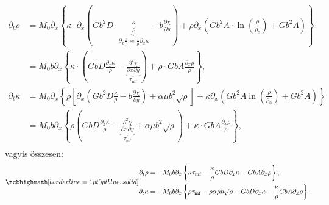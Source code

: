 \documentclass[10pt,a4paper]{scrartcl}
\begin{document}
\[\begin{aligned}
  {\partial _t}\rho  &  = {M_0}{\partial _x}\left\{ {\kappa  \cdot {\partial _x}\left( {G{b^2}D \cdot \underbrace {\frac{\kappa }{\rho }}_{{\partial _x}\frac{\kappa }{\rho } \approx \frac{1}{\rho }{\partial _x}\kappa } - b\frac{{\partial \chi }}{{\partial y}}} \right) + \rho {\partial _x}\left( {G{b^2}A \cdot \ln \left( {\frac{\rho }{{{\rho _0}}}} \right) + G{b^2}A} \right)} \right\} \\ 
   &  = {M_0}b{\partial _x}\left\{ {\kappa  \cdot \left( {GbD\frac{{{\partial _x}\kappa }}{\rho } - \underbrace {\frac{{{\partial ^2}\chi }}{{\partial x\partial y}}}_{{\tau _{{\text{mf}}}}}} \right) + \rho  \cdot GbA\frac{{{\partial _x}\rho }}{\rho }} \right\}, \\ 
  {\partial _t}\kappa  &  = {M_0}{\partial _x}\left\{ {\rho \left[ {{\partial _x}\left( {G{b^2}D\frac{\kappa }{\rho } - b\frac{{\partial \chi }}{{\partial y}}} \right) + \alpha \mu {b^2}\sqrt \rho } \right] + \kappa {\partial _x}\left( {G{b^2}A\ln \left( {\frac{\rho }{{{\rho _0}}}} \right) + G{b^2}A} \right)} \right\} \\ 
   &  = {M_0}b{\partial _x}\left\{ {\rho \left( {GbD\frac{{{\partial _x}\kappa }}{\rho } - \underbrace {\frac{{{\partial ^2}\chi }}{{\partial x\partial y}}}_{{\tau _{{\text{mf}}}}} + \alpha \mu {b^2}\sqrt \rho } \right) + \kappa  \cdot GbA\frac{{{\partial _x}\rho }}{\rho }} \right\}, \\ 
\end{aligned} \]
vagyis összesen:
\begin{gather} \label{eq:rho_kappa}
\tcbhighmath[borderline={1pt}{0pt}{blue,solid}]{
\begin{aligned}
  {\partial _t}\rho  &  =  - {M_0}b{\partial _x}\left\{ {\kappa {\tau _{{\text{mf}}}} - \frac{\kappa }{\rho }GbD{\partial _x}\kappa  - GbA{\partial _x}\rho } \right\}, \\ 
  {\partial _t}\kappa  &  =  - {M_0}b{\partial _x}\left\{ {\rho {\tau _{{\text{mf}}}} - \rho \alpha \mu b\sqrt \rho - GbD{\partial _x}\kappa  - \frac{\kappa }{\rho } GbA{\partial _x}\rho } \right\}.
  \end{aligned}}
\end{gather}
\end{document}
